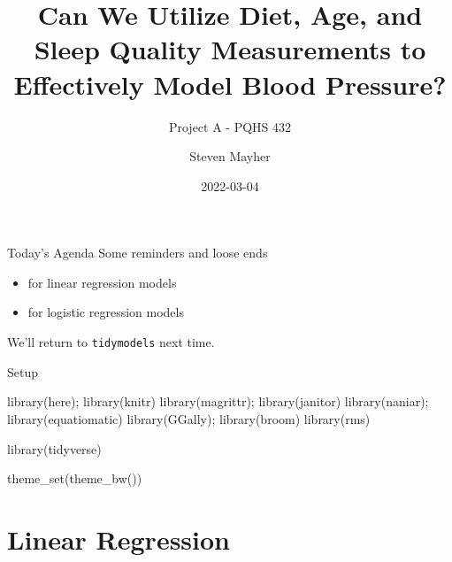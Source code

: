 \documentclass[
  ignorenonframetext,
]{beamer}
\title{Can We Utilize Diet, Age, and Sleep Quality Measurements to
Effectively Model Blood Pressure?}
\subtitle{Project A - PQHS 432}
\author{Steven Mayher}
\date{2022-03-04}
\newenvironment{Shaded}{\begin{snugshade}}{\end{snugshade}}
\newcommand{\FunctionTok}[1]{\textcolor[rgb]{0.00,0.00,0.00}{#1}}
\newcommand{\NormalTok}[1]{#1}
\providecommand{\tightlist}{%
  \setlength{\itemsep}{0pt}\setlength{\parskip}{0pt}}
\begin{document}
\frame{\titlepage}

\begin{frame}[fragile]{Today's Agenda}
\protect\hypertarget{todays-agenda}{}
Some reminders and loose ends

\begin{itemize}
\tightlist
\item
  for linear regression models
\item
  for logistic regression models
\end{itemize}

We'll return to \texttt{tidymodels} next time.
\end{frame}

\begin{frame}[fragile]{Setup}
\protect\hypertarget{setup}{}
\begin{Shaded}
\begin{Highlighting}[]
\FunctionTok{library}\NormalTok{(here); }\FunctionTok{library}\NormalTok{(knitr)}
\FunctionTok{library}\NormalTok{(magrittr); }\FunctionTok{library}\NormalTok{(janitor)}
\FunctionTok{library}\NormalTok{(naniar); }\FunctionTok{library}\NormalTok{(equatiomatic)}
\FunctionTok{library}\NormalTok{(GGally); }\FunctionTok{library}\NormalTok{(broom)}
\FunctionTok{library}\NormalTok{(rms)}

\FunctionTok{library}\NormalTok{(tidyverse)}

\FunctionTok{theme\_set}\NormalTok{(}\FunctionTok{theme\_bw}\NormalTok{())}
\end{Highlighting}
\end{Shaded}
\end{frame}

\hypertarget{linear-regression}{%
\section{Linear Regression}\label{linear-regression}}
\end{document}
